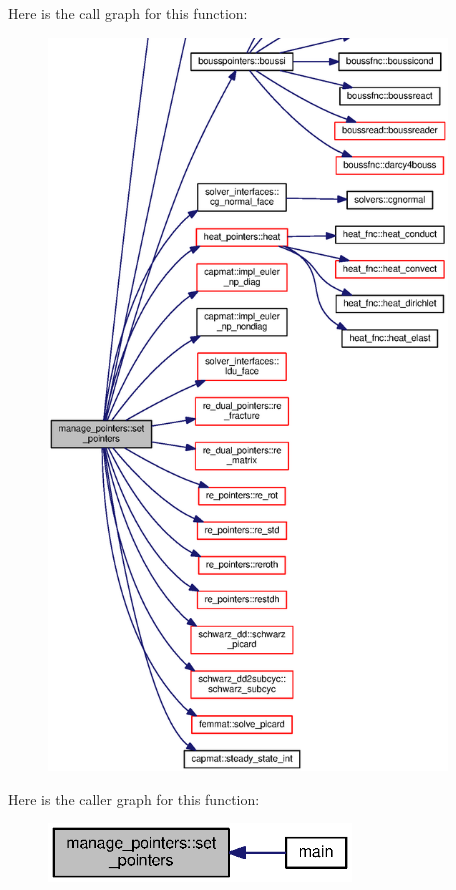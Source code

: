 Here is the call graph for this function\+:\nopagebreak
\begin{figure}[H]
\begin{center}
\leavevmode
\includegraphics[height=550pt]{namespacemanage__pointers_a8275d1f0bd8032fa68b910b70058a4cf_cgraph}
\end{center}
\end{figure}




Here is the caller graph for this function\+:\nopagebreak
\begin{figure}[H]
\begin{center}
\leavevmode
\includegraphics[width=228pt]{namespacemanage__pointers_a8275d1f0bd8032fa68b910b70058a4cf_icgraph}
\end{center}
\end{figure}



